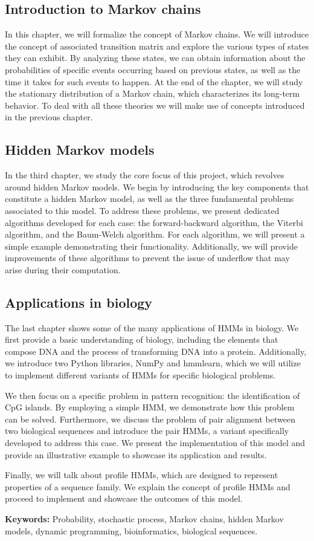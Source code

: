 \subsection*{Introduction to Markov chains}
In this chapter, we will formalize the concept of Markov chains. We will introduce the concept of associated transition matrix and explore the various types of states they can exhibit. By analyzing these states, we can obtain information about the probabilities of specific events occurring based on previous states, as well as the time it takes for such events to happen. At the end of the chapter, we will study the stationary distribution of a Markov chain, which characterizes its long-term behavior. To deal with all these theories we will make use of concepts introduced in the previous chapter.

\subsection*{Hidden Markov models}
In the third chapter, we study the core focus of this project, which revolves around hidden Markov models. We begin by introducing the key components that constitute a hidden Markov model, as well as the three fundamental problems associated to this model. To address these problems, we present dedicated algorithms developed for each case: the forward-backward algorithm, the Viterbi algorithm, and the Baum-Welch algorithm. For each algorithm, we will present a simple example demonstrating their functionality. Additionally, we will provide improvements of these algorithms to prevent the issue of underflow that may arise during their computation.

\subsection*{Applications in biology}
The last chapter shows some of the many applications of HMMs in biology. We first provide a basic understanding of biology, including the elements that compose DNA and the process of transforming DNA into a protein. Additionally, we introduce two Python libraries, NumPy and hmmlearn, which we will utilize to implement different variants of HMMs for specific biological problems.

We then focus on a specific problem in pattern recognition: the identification of CpG islands. By employing a simple HMM, we demonstrate how this problem can be solved. Furthermore, we discuss the problem of pair alignment between two biological sequences and introduce the pair HMMs, a variant specifically developed to address this case. We present the implementation of this model and provide an illustrative example to showcase its application and results.

Finally, we will talk about profile HMMs, which are designed to represent properties of a sequence family. We explain the concept of profile HMMs and proceed to implement and showcase the outcomes of this model.

\textbf{Keywords:} Probability, stochastic process, Markov chains, hidden Markov models, dynamic programming, bioinformatics, biological sequences.